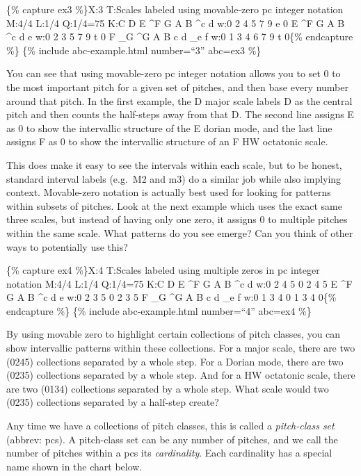 \documentclass{book}
\begin{document}
\{\% capture ex3 \%\}X:3 T:Scales labeled using movable-zero pc integer
notation M:4/4 L:1/4 Q:1/4=75 K:C D E \^{}F G\textbar{} A B \^{}c d\textbar{]}
w:0 2 4 5 7 9 e 0 E \^{}F G A\textbar{} B \^{}c d e\textbar{]} w:0 2 3 5 7 9 t
0 F \_G \^{}G A\textbar{} B c d \_e\textbar{} f\textbar{]} w:0 1 3 4 6 7 9 t
0\{\% endcapture \%\} \{\% include abc-example.html number=``3'' abc=ex3 \%\}

You can see that using movable-zero pc integer notation allows you to set 0 to
the most important pitch for a given set of pitches, and then base every
number around that pitch. In the first example, the D major scale labels D as
the central pitch and then counts the half-steps away from that D. The second
line assigns E as 0 to show the intervallic structure of the E dorian mode,
and the last line assigns F as 0 to show the intervallic structure of an F HW
octatonic scale.

This does make it easy to see the intervals within each scale, but to be
honest, standard interval labels (e.g.~M2 and m3) do a similar job while also
implying context. Movable-zero notation is actually best used for looking for
patterns within subsets of pitches. Look at the next example which uses the
exact same three scales, but instead of having only one zero, it assigns 0 to
multiple pitches within the same scale. What patterns do you see emerge? Can
you think of other ways to potentially use this?

\{\% capture ex4 \%\}X:4 T:Scales labeled using multiple zeros in pc integer
notation M:4/4 L:1/4 Q:1/4=75 K:C D E \^{}F G\textbar{} A B \^{}c d\textbar{]}
w:0 2 4 5 0 2 4 5 E \^{}F G A\textbar{} B \^{}c d e\textbar{]} w:0 2 3 5 0 2 3
5 F \_G \^{}G A\textbar{} B c d \_e\textbar{} f\textbar{]} w:0 1 3 4 0 1 3 4
0\{\% endcapture \%\} \{\% include abc-example.html number=``4'' abc=ex4 \%\}

By using movable zero to highlight certain collections of pitch classes, you
can show intervallic patterns within these collections. For a major scale,
there are two (0245) collections separated by a whole step. For a Dorian mode,
there are two (0235) collections separated by a whole step. And for a HW
octatonic scale, there are two (0134) collections separated by a whole step.
What scale would two (0235) collections separated by a half-step create?

Any time we have a collections of pitch classes, this is called a
\emph{pitch-class set} (abbrev: pcs). A pitch-class set can be any number of
pitches, and we call the number of pitches within a pcs its
\emph{cardinality}. Each cardinality has a special name shown in the chart
below.
\end{document}
